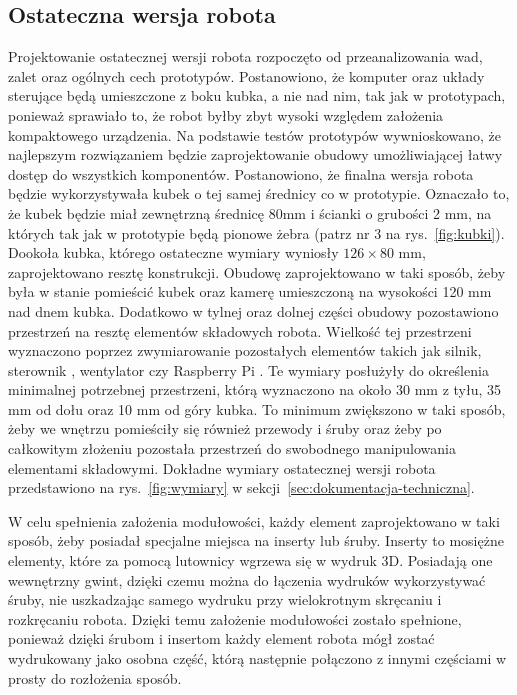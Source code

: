 \subsection{Ostateczna wersja robota}\label{subsec:ostateczna-wersja-robota}
Projektowanie ostatecznej wersji robota rozpoczęto od przeanalizowania wad, zalet oraz ogólnych cech prototypów. Postanowiono, że komputer oraz układy sterujące będą
umieszczone z boku kubka, a nie nad nim, tak jak w prototypach, ponieważ sprawiało to, że robot byłby zbyt wysoki względem założenia kompaktowego urządzenia.
Na podstawie testów prototypów wywnioskowano, że najlepszym rozwiązaniem będzie zaprojektowanie obudowy umożliwiającej łatwy dostęp do wszystkich komponentów.
Postanowiono, że finalna wersja robota będzie wykorzystywała kubek o tej samej średnicy co w prototypie. Oznaczało to, że kubek będzie miał zewnętrzną średnicę 80mm
i ścianki o grubości 2 mm, na których tak jak w prototypie będą pionowe żebra (patrz nr 3 na rys.~\ref{fig:kubki}). Dookoła kubka, którego ostateczne wymiary wyniosły $126 \times 80$ mm,
zaprojektowano resztę konstrukcji. Obudowę zaprojektowano w taki sposób, żeby była w stanie pomieścić kubek oraz kamerę umieszczoną na wysokości 120 mm nad dnem kubka.
Dodatkowo w tylnej oraz dolnej części obudowy pozostawiono przestrzeń na resztę
elementów składowych robota. Wielkość tej przestrzeni wyznaczono poprzez zwymiarowanie pozostałych elementów takich jak silnik, sterownik \cite{L298}, wentylator 
czy Raspberry Pi \cite{malina}. Te wymiary posłużyły do określenia minimalnej potrzebnej przestrzeni, którą wyznaczono na około 30 mm z tyłu, 35 mm od dołu oraz 10 mm od góry kubka. To minimum 
zwiększono w taki sposób, żeby we wnętrzu pomieściły się również przewody i śruby oraz żeby po całkowitym złożeniu pozostała przestrzeń do swobodnego manipulowania
elementami składowymi. Dokładne wymiary ostatecznej wersji robota przedstawiono na rys.~\ref{fig:wymiary} w sekcji~\ref{sec:dokumentacja-techniczna}.

W celu spełnienia założenia modułowości, każdy element
zaprojektowano w taki sposób, żeby posiadał specjalne miejsca na inserty lub śruby. Inserty to mosiężne elementy, które za pomocą lutownicy wgrzewa się
w wydruk 3D. Posiadają one wewnętrzny gwint, dzięki czemu można do łączenia wydruków wykorzystywać śruby, nie uszkadzając samego wydruku przy 
wielokrotnym skręcaniu i rozkręcaniu robota. Dzięki temu założenie modułowości zostało spełnione, ponieważ dzięki śrubom i insertom każdy element robota 
mógł zostać wydrukowany jako osobna część, którą następnie połączono z innymi częściami w prosty do rozłożenia sposób.

